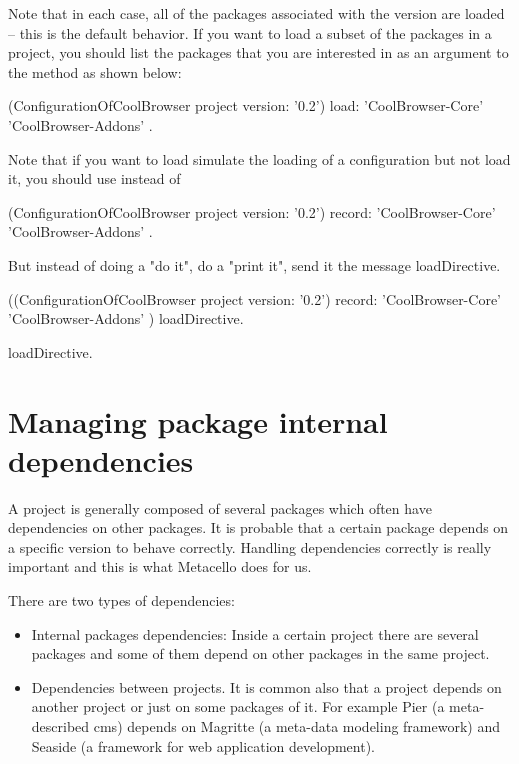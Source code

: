 \documentclass[a4paper,10pt,twoside]{book}
\begin{document}
Note that in each case, all of the packages associated with the version are loaded \--- this  
is the default behavior. If you want to load a subset of the packages in a project, you should list 
the packages that you are interested in as an argument to the  method as shown below:

\begin{code}{}
  (ConfigurationOfCoolBrowser project version: '0.2') load: { 'CoolBrowser-Core' 'CoolBrowser-Addons' }.
\end{code}


Note that if you want to load simulate the loading of a configuration but not load it, you should use  instead of 

\begin{code}{}
  (ConfigurationOfCoolBrowser project version: '0.2') record: { 'CoolBrowser-Core' 'CoolBrowser-Addons' }.
\end{code}

But instead of doing a "do it", do a "print it", send it the message loadDirective.

\begin{code}{}
  ((ConfigurationOfCoolBrowser project version: '0.2') record: { 'CoolBrowser-Core' 'CoolBrowser-Addons' }) loadDirective.
\end{code} loadDirective.


\section{Managing package internal dependencies}

A project is generally composed of several packages which often have dependencies on other packages.  It is probable that a certain package depends on a specific version to behave correctly. Handling dependencies correctly is really important and this is what Metacello does for us. 

There are two types of dependencies:
\begin{itemize}
\item Internal packages dependencies: Inside a certain project there are several packages and some of them depend on other packages in the same project. 
\item Dependencies between projects. It is common also that a project depends on another project or just on some packages of it. For example Pier (a meta-described cms) depends on Magritte (a meta-data modeling framework) and Seaside (a framework for web application development).
\end{itemize}
\end{document}
